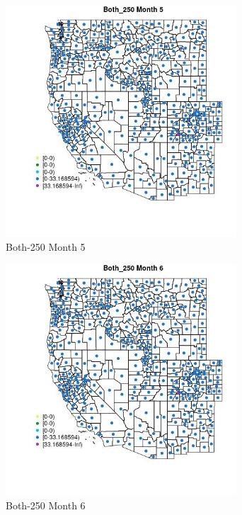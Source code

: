 \begin{figure} 
\centering  
\includegraphics[width=0.77\textwidth]{Code_Outputs/df_report_ML_predictors_CountyCentroid_Locations_Dates_2008-01-01to2018-12-31_MapObsMo5Both_250.jpg} 
\caption{\label{fig:df_report_ML_predictors_CountyCentroid_Locations_Dates_2008-01-01to2018-12-31MapObsMo5Both_250}Both-250 Month 5} 
\end{figure} 
 

\begin{figure} 
\centering  
\includegraphics[width=0.77\textwidth]{Code_Outputs/df_report_ML_predictors_CountyCentroid_Locations_Dates_2008-01-01to2018-12-31_MapObsMo6Both_250.jpg} 
\caption{\label{fig:df_report_ML_predictors_CountyCentroid_Locations_Dates_2008-01-01to2018-12-31MapObsMo6Both_250}Both-250 Month 6} 
\end{figure} 
 

